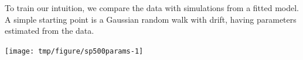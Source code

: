 \begin{frame}[fragile]
To train our intuition, we compare the data with simulations from a fitted model. A simple starting point is a Gaussian random walk with drift, having parameters estimated from the data.

\begin{knitrout}\small
{}\color{fgcolor}\begin{kframe}
\begin{alltt}
 \hlkwb{<-} \hldef{(}\hldef{(}
 \hlkwb{<-} \hldef{(}\hldef{(}
 \hlkwb{<-} 
 \hlkwb{<-} \hldef{(sp500[}\hldef{])}\hlopt{+}\hldef{(}\hldef{(}\hldef{,}\hlopt{-}\hldef{,}
 \hlkwb{<-} \hldef{(sp500[}\hldef{])}\hlopt{+}\hldef{(}\hldef{(}\hldef{,}\hlopt{-}\hldef{,}
\hldef{=}\hldef{) ;} \hldef{=}\hldef{)}
\end{alltt}
\end{kframe}
\end{knitrout}

\vspace{-8mm}

\begin{knitrout}\small
{}\color{fgcolor}

{\centering \texttt{[image: tmp/figure/sp500params-1]} 

}


\end{knitrout}

\end{frame}

